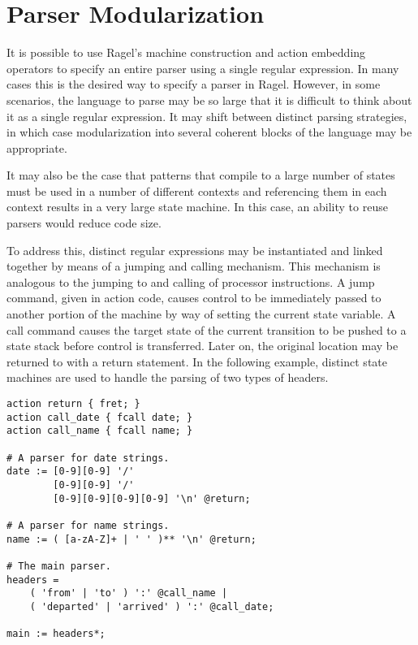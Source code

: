 \documentclass[letterpaper,11pt,oneside]{book}
\newenvironment{inline_code}{\def\baselinestretch{1}\vspace{12pt}\small}{}
\begin{document}
\section{Parser Modularization}

It is possible to use Ragel's machine construction and action embedding
operators to specify an entire parser using a single regular expression. In
many cases this is the desired way to specify a parser in Ragel. However, in
some scenarios, the language to parse may be so large that it is difficult to
think about it as a single regular expression. It may shift between distinct
parsing strategies, in which case modularization into several coherent blocks
of the language may be appropriate.

It may also be the case that patterns that compile to a large number of states
must be used in a number of different contexts and referencing them in each
context results in a very large state machine. In this case, an ability to reuse
parsers would reduce code size.

To address this, distinct regular expressions may be instantiated and linked
together by means of a jumping and calling mechanism. This mechanism is
analogous to the jumping to and calling of processor instructions. A jump
command, given in action code, causes control to be immediately passed to
another portion of the machine by way of setting the current state variable. A
call command causes the target state of the current transition to be pushed to
a state stack before control is transferred.  Later on, the original location
may be returned to with a return statement. In the following example, distinct
state machines are used to handle the parsing of two types of headers.

\begin{inline_code}
\begin{verbatim}
action return { fret; }
action call_date { fcall date; }
action call_name { fcall name; }

# A parser for date strings.
date := [0-9][0-9] '/' 
        [0-9][0-9] '/' 
        [0-9][0-9][0-9][0-9] '\n' @return;

# A parser for name strings.
name := ( [a-zA-Z]+ | ' ' )** '\n' @return;

# The main parser.
headers = 
    ( 'from' | 'to' ) ':' @call_name | 
    ( 'departed' | 'arrived' ) ':' @call_date;

main := headers*;
\end{verbatim}
\end{inline_code}
\end{document}
